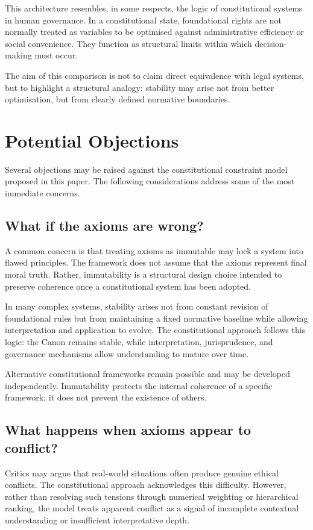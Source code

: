 \documentclass[11pt]{article}
\begin{document}
This architecture resembles, in some respects, the logic of constitutional systems in human governance. In a constitutional state, foundational rights are not normally treated as variables to be optimised against administrative efficiency or social convenience. They function as structural limits within which decision-making must occur.

The aim of this comparison is not to claim direct equivalence with legal systems, but to highlight a structural analogy: stability may arise not from better optimisation, but from clearly defined normative boundaries.

\section{Potential Objections}

Several objections may be raised against the constitutional constraint model proposed in this paper. The following considerations address some of the most immediate concerns.

\subsection{What if the axioms are wrong?}

A common concern is that treating axioms as immutable may lock a system into flawed principles. The framework does not assume that the axioms represent final moral truth. Rather, immutability is a structural design choice intended to preserve coherence once a constitutional system has been adopted.

In many complex systems, stability arises not from constant revision of foundational rules but from maintaining a fixed normative baseline while allowing interpretation and application to evolve. The constitutional approach follows this logic: the Canon remains stable, while interpretation, jurisprudence, and governance mechanisms allow understanding to mature over time.

Alternative constitutional frameworks remain possible and may be developed independently. Immutability protects the internal coherence of a specific framework; it does not prevent the existence of others.

\subsection{What happens when axioms appear to conflict?}

Critics may argue that real-world situations often produce genuine ethical conflicts. The constitutional approach acknowledges this difficulty. However, rather than resolving such tensions through numerical weighting or hierarchical ranking, the model treats apparent conflict as a signal of incomplete contextual understanding or insufficient interpretative depth.
\end{document}
